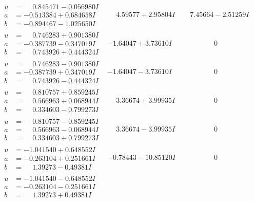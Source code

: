 \documentclass[1p]{elsarticle_modified}
\theoremstyle{definition}
\begin{document}
$$\begin{array}{c|c|c}
\begin{aligned}
u &= \phantom{-}0.845471 - 0.056980 I \\
a &= -0.513384 + 0.684658 I \\
b &= -0.894467 - 1.025650 I\end{aligned}
 & \phantom{-}4.59577 + 2.95804 I & \phantom{-}7.45664 - 2.51259 I \\ \hline\begin{aligned}
u &= \phantom{-}0.746283 + 0.901380 I \\
a &= -0.387739 - 0.347019 I \\
b &= \phantom{-}0.743926 + 0.444324 I\end{aligned}
 & -1.64047 + 3.73610 I & \phantom{-0.000000 } 0 \\ \hline\begin{aligned}
u &= \phantom{-}0.746283 - 0.901380 I \\
a &= -0.387739 + 0.347019 I \\
b &= \phantom{-}0.743926 - 0.444324 I\end{aligned}
 & -1.64047 - 3.73610 I & \phantom{-0.000000 } 0 \\ \hline\begin{aligned}
u &= \phantom{-}0.810757 + 0.859245 I \\
a &= \phantom{-}0.566963 + 0.068944 I \\
b &= \phantom{-}0.334603 - 0.799273 I\end{aligned}
 & \phantom{-}3.36674 + 3.99935 I & \phantom{-0.000000 } 0 \\ \hline\begin{aligned}
u &= \phantom{-}0.810757 - 0.859245 I \\
a &= \phantom{-}0.566963 - 0.068944 I \\
b &= \phantom{-}0.334603 + 0.799273 I\end{aligned}
 & \phantom{-}3.36674 - 3.99935 I & \phantom{-0.000000 } 0 \\ \hline\begin{aligned}
u &= -1.041540 + 0.648552 I \\
a &= -0.263104 + 0.251661 I \\
b &= \phantom{-}1.39273 - 0.49381 I\end{aligned}
 & -0.78443 - 10.85120 I & \phantom{-0.000000 } 0 \\ \hline\begin{aligned}
u &= -1.041540 - 0.648552 I \\
a &= -0.263104 - 0.251661 I \\
b &= \phantom{-}1.39273 + 0.49381 I\end{aligned}

\end{array}$$
\end{document}
